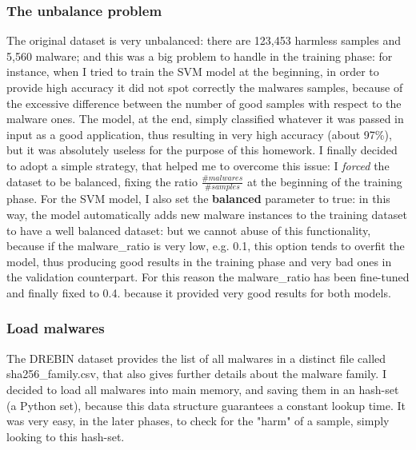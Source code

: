 \documentclass[12pt]{article}
\begin{document}
\subsubsection{The unbalance problem}
The original dataset is very unbalanced: there are 123,453 harmless samples and 5,560 malware; and this was a big problem to handle in the training phase: for instance, when I tried to train the SVM model at the beginning, in order to provide high accuracy it did not spot correctly the malwares samples, because of the excessive difference between the number of good samples with respect to the malware ones. The model, at the end, simply classified whatever it was passed in input as a good application, thus resulting in very high accuracy (about 97\%), but it was absolutely useless for the purpose of this homework. I finally decided to adopt a simple strategy, that helped me to overcome this issue: I \textit{forced} the dataset to be balanced, fixing the ratio $ \frac{\# malwares}{\# samples}$ at the beginning of the training phase. For the SVM model, I also set the \textbf{balanced} parameter to true: in this way, the model automatically adds new malware instances to the training dataset to have a well balanced dataset: but we cannot abuse of this functionality, because if the malware\_ratio is very low, e.g. 0.1, this option tends to overfit the model, thus producing good results in the training phase and very bad ones in the validation counterpart. For this reason the malware\_ratio has been fine-tuned and finally fixed to 0.4. because it provided very good results for both models.

\subsubsection{Load malwares}
The DREBIN dataset provides the list of all malwares in a distinct file called sha256\_family.csv, that also gives further details about the malware family.  I decided to load all malwares into main memory, and saving them in an hash-set (a Python set), because this data structure guarantees a constant lookup time. It was very easy, in the later phases, to check for the "harm" of a sample, simply looking to this hash-set. 
\end{document}
